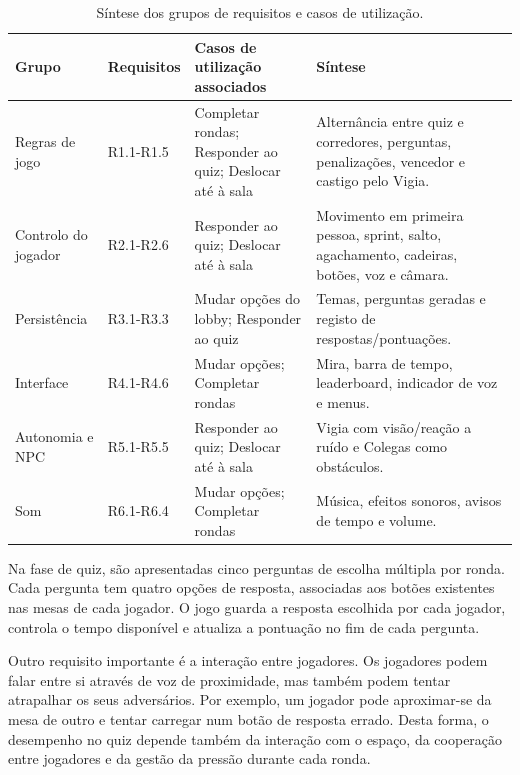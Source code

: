 \begin{table}[H]
   \centering
   \caption{Síntese dos grupos de requisitos e casos de utilização.}
   \label{tab:requisitos}
   {
   \scriptsize
   \setlength{\tabcolsep}{4pt}
   \renewcommand{\arraystretch}{1.05}
   \begin{tabular}{|p{2.5cm}|p{2.0cm}|p{4.4cm}|p{5.1cm}|}
      \hline
      \textbf{Grupo} & \textbf{Requisitos} & \textbf{Casos de utilização associados} & \textbf{Síntese}
      \\ \hline
      Regras de jogo & R1.1-R1.5 & Completar rondas; Responder ao quiz; Deslocar até à sala & Alternância entre quiz e corredores, perguntas, penalizações, vencedor e castigo pelo Vigia.
      \\ \hline
      Controlo do jogador & R2.1-R2.6 & Responder ao quiz; Deslocar até à sala & Movimento em primeira pessoa, sprint, salto, agachamento, cadeiras, botões, voz e câmara.
      \\ \hline
      Persistência & R3.1-R3.3 & Mudar opções do lobby; Responder ao quiz & Temas, perguntas geradas e registo de respostas/pontuações.
      \\ \hline
      Interface & R4.1-R4.6 & Mudar opções; Completar rondas & Mira, barra de tempo, leaderboard, indicador de voz e menus.
      \\ \hline
      Autonomia e NPC & R5.1-R5.5 & Responder ao quiz; Deslocar até à sala & Vigia com visão/reação a ruído e Colegas como obstáculos.
      \\ \hline
      Som & R6.1-R6.4 & Mudar opções; Completar rondas & Música, efeitos sonoros, avisos de tempo e volume.
      \\ \hline
   \end{tabular}
   }
\end{table}

Na fase de quiz, são apresentadas cinco perguntas de escolha múltipla por ronda. Cada pergunta tem quatro opções de resposta, associadas aos botões existentes nas mesas de cada jogador. O jogo guarda a resposta escolhida por cada jogador, controla o tempo disponível e atualiza a pontuação no fim de cada pergunta.

Outro requisito importante é a interação entre jogadores. Os jogadores podem falar entre si através de voz de proximidade, mas também podem tentar atrapalhar os seus adversários. Por exemplo, um jogador pode aproximar-se da mesa de outro e tentar carregar num botão de resposta errado. Desta forma, o desempenho no quiz depende também da interação com o espaço, da cooperação entre jogadores e da gestão da pressão durante cada ronda.

